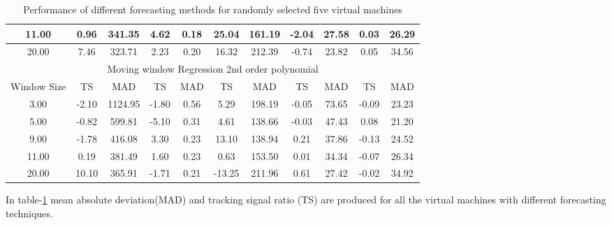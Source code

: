 \documentclass[conference,onecolumn]{IEEEtran}
\begin{document}
\begin{table}[ht]
\begin{tabular}{|c|c|c|c|c|c|c|c|c|c|c|}
11.00       & 0.96             & 341.35           & 4.62               & 0.18            & 25.04           & 161.19         & -2.04            & 27.58           & 0.03             & 26.29            \\ \hline
20.00       & 7.46             & 323.71           & 2.23               & 0.20            & 16.32           & 212.39         & -0.74            & 23.82           & 0.05             & 34.56            \\ \hline
\multicolumn{11}{|c|}{Moving window Regression 2nd order polynomial}                                                                                                                                   \\ \hline
Window Size & TS               & MAD              & TS                 & MAD             & TS              & MAD            & TS               & MAD             & TS               & MAD              \\ \hline
3.00        & -2.10            & 1124.95          & -1.80              & 0.56            & 5.29            & 198.19         & -0.05            & 73.65           & -0.09            & 23.23            \\ \hline
5.00        & -0.82            & 599.81           & -5.10              & 0.31            & 4.61            & 138.66         & -0.03            & 47.43           & 0.08             & 21.20            \\ \hline
9.00        & -1.78            & 416.08           & 3.30               & 0.23            & 13.10           & 138.94         & 0.21             & 37.86           & -0.13            & 24.52            \\ \hline
11.00       & 0.19             & 381.49           & 1.60               & 0.23            & 0.63            & 153.50         & 0.01             & 34.34           & -0.07            & 26.34            \\ \hline
20.00       & 10.10            & 365.91           & -1.71              & 0.21            & -13.25          & 211.96         & 0.61             & 27.42           & -0.02            & 34.92            \\ \hline
\end{tabular}
\caption{Performance of different forecasting methods for randomly selected five virtual machines}
\label{table:results}
\end{table}

In table-\ref{table:results} mean absolute deviation(MAD) and tracking signal ratio (TS) are produced for all the virtual machines with different forecasting techniques.
\end{document}

